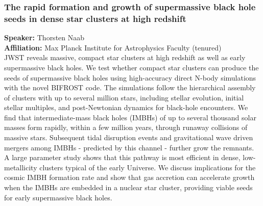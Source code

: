 \subsubsection*{The rapid formation and growth of supermassive black hole seeds in dense star clusters at high redshift}
\textbf{Speaker:} Thorsten Naab \\
\textbf{Affiliation:} Max Planck Institute for Astrophysics \textperiodcentered{} Faculty (tenured)\\
JWST reveals massive, compact star clusters at high redshift as well as early supermassive black holes. We test whether compact star clusters can produce the seeds of supermassive black holes using high-accuracy direct N-body simulations with the novel BIFROST code. The simulations follow the hierarchical assembly of clusters with up to several million stars, including stellar evolution, initial stellar multiples, and post-Newtonian dynamics for black-hole encounters. We find that intermediate-mass black holes (IMBHs) of up to several thousand solar masses form rapidly, within a few million years, through runaway collisions of massive stars. Subsequent tidal disruption events and gravitational wave driven mergers among IMBHs - predicted by this channel - further grow the remnants. A large parameter study shows that this pathway is most efficient in dense, low-metallicity clusters typical of the early Universe. We discuss implications for the cosmic IMBH formation rate and show that gas accretion can accelerate growth when the IMBHs are embedded in a nuclear star cluster, providing viable seeds for early supermassive black holes.

\hypertarget{abs-62}{}
